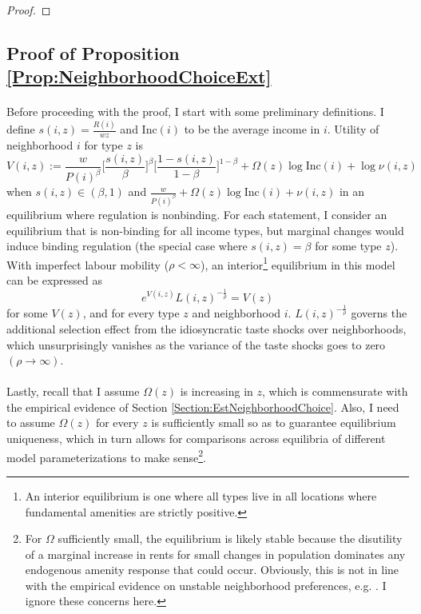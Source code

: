 \documentclass[12pt]{article}
\begin{document}
\begin{enumerate}
\begin{proof}
		\end{proof}
		
	\end{enumerate}
	
	\clearpage
	\subsection{Proof of Proposition \ref{Prop:NeighborhoodChoiceExt}}\label{Proof:NeighborhoodChoiceExt}
	
	\paragraph*{}
	Before proceeding with the proof, I start with some preliminary definitions. I define $s(i, z) = \frac{R(i)}{wz}$ and $\text{Inc}(i)$ to be the average income in $i$. Utility of neighborhood $i$ for type $z$ is $$V(i, z) := \frac{w}{P(i)^{\beta}}\bigg[\frac{s(i, z)}{\beta}\bigg]^{\beta}\bigg[\frac{1 - s(i, z)}{1 - \beta}\bigg]^{1 - \beta} + \Omega(z)\log \text{Inc}(i) + \log \nu(i, z)$$ when $s(i, z) \in (\beta, 1)$ and $\frac{w}{P(i)^{\beta}} + \Omega(z)\log \text{Inc}(i) + \nu(i, z)$ in an equilibrium where regulation is nonbinding. For each statement, I consider an equilibrium that is non-binding for all income types, but marginal changes would induce binding regulation (the special case where $s(i, z) = \beta$ for some type $z$). With imperfect labour mobility ($\rho < \infty$), an interior\footnote{An interior equilibrium is one where all types live in all locations where fundamental amenities are strictly positive. } equilibrium in this model can be expressed as 
	\begin{equation}\label{AppendixEq:EquilibriumPropNCE}
		e^{V(i, z)}L(i, z)^{-\frac{1}{\rho}} = V(z)
	\end{equation}
	for some $V(z)$, and for every type $z$ and neighborhood $i$. $L(i, z)^{-\frac{1}{\rho}}$ governs the additional selection effect from the idiosyncratic taste shocks over neighborhoods, which unsurprisingly vanishes as the variance of the taste shocks goes to zero $(\rho \to \infty)$. 
	
	\paragraph*{}
	Lastly, recall that I assume $\Omega(z)$ is increasing in $z$, which is commensurate with the empirical evidence of Section \ref{Section:EstNeighborhoodChoice}. Also, I need to assume $\Omega(z)$ for every $z$ is sufficiently small so as to guarantee equilibrium uniqueness, which in turn allows for comparisons across equilibria of different model parameterizations to make sense\footnote{For $\Omega$ sufficiently small, the equilibrium is likely stable because the disutility of a marginal increase in rents for small changes in population dominates any endogenous amenity response that could occur. Obviously, this is not in line with the empirical evidence on unstable neighborhood preferences, e.g. \citep{davisetalracepref}. I ignore these concerns here.}.
	
\end{document}
